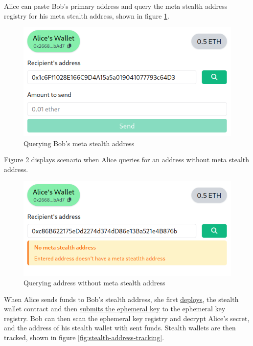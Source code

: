 Alice can paste Bob's primary address and query the meta stealth address
registry for his meta stealth address, shown in figure \ref{fig:meta-query}.

\begin{figure}[h!]
    \centering
    \includegraphics[width=\textwidth]{assets/images/demo/meta-query.png}
    \caption{Querying Bob's meta stealth address}
    \label{fig:meta-query}
\end{figure}

Figure \ref{fig:meta-not-found} displays scenario when Alice queries for an
address without meta stealth address.

\begin{figure}[h!]
    \centering
    \includegraphics[width=\textwidth]{assets/images/demo/meta-not-found.png}
    \caption{Querying address without meta stealth address}
    \label{fig:meta-not-found}
\end{figure}

\pagebreak
When Alice sends funds to Bob's stealth address, she first 
\href{https://sepolia.etherscan.io/tx/0xabac631e68de9c31a4cf00d55328b9a35fff55f6baf475849197415c62b1d394}{deploys},
the stealth wallet contract and then 
\href{https://sepolia.etherscan.io/tx/0xce4a7169458a1e09ee027645c833a9a16a0ff10557a61d7fa5c3b3dabf7abee8}{submits the ephemeral key}
to the ephemeral key registry. Bob can then scan the ephemeral key registry and decrypt Alice's secret, and the
address of his stealth wallet with sent funds. Stealth wallets are then tracked,
shown in figure \ref{fig:stealth-address-tracking}.

